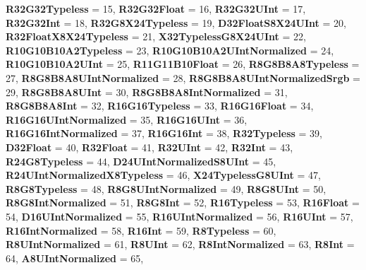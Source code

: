 \begin{DoxyCompactItemize}
{\bfseries R32\+G32\+Typeless} = 15, 
{\bfseries R32\+G32\+Float} = 16, 
{\bfseries R32\+G32\+U\+Int} = 17, 
\newline
{\bfseries R32\+G32\+Int} = 18, 
{\bfseries R32\+G8\+X24\+Typeless} = 19, 
{\bfseries D32\+Float\+S8\+X24\+U\+Int} = 20, 
{\bfseries R32\+Float\+X8\+X24\+Typeless} = 21, 
\newline
{\bfseries X32\+Typeless\+G8\+X24\+U\+Int} = 22, 
{\bfseries R10\+G10\+B10\+A2\+Typeless} = 23, 
{\bfseries R10\+G10\+B10\+A2\+U\+Int\+Normalized} = 24, 
{\bfseries R10\+G10\+B10\+A2\+U\+Int} = 25, 
\newline
{\bfseries R11\+G11\+B10\+Float} = 26, 
{\bfseries R8\+G8\+B8\+A8\+Typeless} = 27, 
{\bfseries R8\+G8\+B8\+A8\+U\+Int\+Normalized} = 28, 
{\bfseries R8\+G8\+B8\+A8\+U\+Int\+Normalized\+Srgb} = 29, 
\newline
{\bfseries R8\+G8\+B8\+A8\+U\+Int} = 30, 
{\bfseries R8\+G8\+B8\+A8\+Int\+Normalized} = 31, 
{\bfseries R8\+G8\+B8\+A8\+Int} = 32, 
{\bfseries R16\+G16\+Typeless} = 33, 
\newline
{\bfseries R16\+G16\+Float} = 34, 
{\bfseries R16\+G16\+U\+Int\+Normalized} = 35, 
{\bfseries R16\+G16\+U\+Int} = 36, 
{\bfseries R16\+G16\+Int\+Normalized} = 37, 
\newline
{\bfseries R16\+G16\+Int} = 38, 
{\bfseries R32\+Typeless} = 39, 
{\bfseries D32\+Float} = 40, 
{\bfseries R32\+Float} = 41, 
\newline
{\bfseries R32\+U\+Int} = 42, 
{\bfseries R32\+Int} = 43, 
{\bfseries R24\+G8\+Typeless} = 44, 
{\bfseries D24\+U\+Int\+Normalized\+S8\+U\+Int} = 45, 
\newline
{\bfseries R24\+U\+Int\+Normalized\+X8\+Typeless} = 46, 
{\bfseries X24\+Typeless\+G8\+U\+Int} = 47, 
{\bfseries R8\+G8\+Typeless} = 48, 
{\bfseries R8\+G8\+U\+Int\+Normalized} = 49, 
\newline
{\bfseries R8\+G8\+U\+Int} = 50, 
{\bfseries R8\+G8\+Int\+Normalized} = 51, 
{\bfseries R8\+G8\+Int} = 52, 
{\bfseries R16\+Typeless} = 53, 
\newline
{\bfseries R16\+Float} = 54, 
{\bfseries D16\+U\+Int\+Normalized} = 55, 
{\bfseries R16\+U\+Int\+Normalized} = 56, 
{\bfseries R16\+U\+Int} = 57, 
\newline
{\bfseries R16\+Int\+Normalized} = 58, 
{\bfseries R16\+Int} = 59, 
{\bfseries R8\+Typeless} = 60, 
{\bfseries R8\+U\+Int\+Normalized} = 61, 
\newline
{\bfseries R8\+U\+Int} = 62, 
{\bfseries R8\+Int\+Normalized} = 63, 
{\bfseries R8\+Int} = 64, 
{\bfseries A8\+U\+Int\+Normalized} = 65, 

\end{DoxyCompactItemize}
